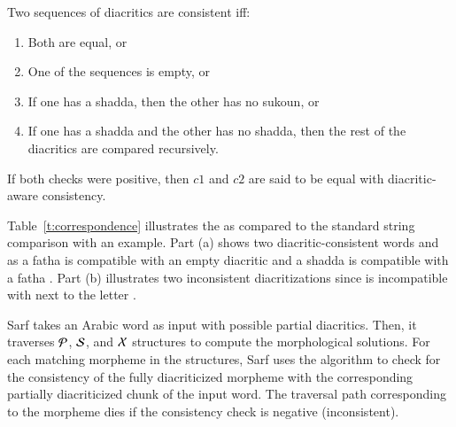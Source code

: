 Two sequences of diacritics are consistent iff:
\begin{enumerate}
  \item Both are equal, or
  \item One of the sequences is empty, or
  \item If one has a shadda, then the other has no sukoun, or
  \item If one has a shadda and the other has no shadda, then the rest of the diacritics are compared recursively. 
\end{enumerate}

If both checks were positive, then $c1$ and $c2$ are said to be equal with diacritic-aware consistency. 



Table~\ref{t:correspondence} illustrates the 
 as compared to the standard
string comparison with an example. 
Part (a) shows two diacritic-consistent words 
\vocalize
{} and  as a fatha  is compatible with an empty diacritic 
and a shadda  is compatible with a fatha . 
Part (b) illustrates two inconsistent diacritizations 
since  is incompatible with  next to the letter .

Sarf takes an Arabic word as input with possible partial diacritics. 
Then, it traverses ${\cal P}$, ${\cal S}$, and ${\cal X}$ structures 
to compute the morphological solutions. 
For each matching morpheme in the structures, 
Sarf uses the  algorithm 
to check for the consistency of the fully diacriticized morpheme
with the corresponding partially diacriticized chunk of the input word.
The traversal path corresponding to the morpheme dies if the consistency 
check is negative (inconsistent).

